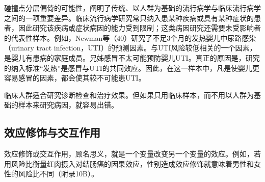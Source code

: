 碰撞点分层偏倚的可能性，阐明了传统、以人群为基础的流行病学与临床流行病学之间的一项重要差异。临床流行病学研究常只纳入患某种疾病或具有某种症状的患者，因此研究该疾病或症状病因的能力受到限制；这类病因研究还需要未受影响者的代表性样本。例如，Newman等（40）研究了不足3个月的发热婴儿中尿路感染（urinary tract infection，UTI）的预测因素。与UTI风险较低相关的一个因素，是婴儿有患病的家庭成员。兄姊感冒不太可能预防婴儿UTI。真正的原因是，研究的纳入标准“发热”是感冒与UTI的共同效应。因此，在这一样本中，凡是使婴儿更容易感冒的因素，都会使其较不可能患UTI。

临床人群适合研究诊断检查和治疗效果。但如果只用临床样本，而不用以人群为基础的样本来研究病因，就容易出错。

\subsection{效应修饰与交互作用}
效应修饰或交互作用，顾名思义，就是一个变量改变另一个变量的效应。例如，若用风险比衡量红肉摄入对结肠癌的因果效应，性别造成效应修饰就意味着男性和女性的风险比不同（附录10B）。

